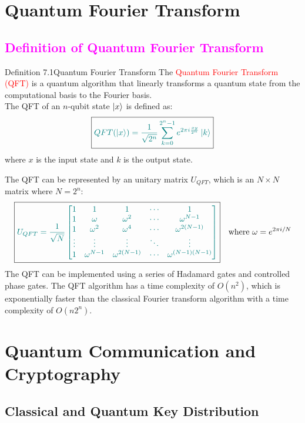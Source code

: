 \documentclass{book}
\begin{document}
\chapter{Quantum Fourier Transform}
\textcolor{magenta}{\section{\textbf{Definition of Quantum Fourier Transform}}}
\begin{defBox}{Definition 7.1}{Quantum Fourier Transform}
    The \textcolor{red}{Quantum Fourier Transform (QFT)} is a quantum algorithm that linearly transforms a quantum state from the computational basis to the Fourier basis.\\
    The QFT of an $n$-qubit state $\ket{x}$ is defined as:
    \[
        \boxed{\textcolor{teal}{QFT(\ket{x}) = \frac{1}{\sqrt{2^n}} \sum_{k=0}^{2^n - 1} e^{2\pi i \frac{xy}{2^n}} \ket{k}}}
    \]
    where $x$ is the input state and $k$ is the output state.
\end{defBox}
The QFT can be represented by an unitary matrix $U_{QFT}$, which is an $N \times N$ matrix where $N = 2^n$:
\[
    \boxed{\textcolor{teal}{U_{QFT} = \frac{1}{\sqrt{N}} \begin{bmatrix} 
        1 & 1 & 1 & \cdots & 1 \\
        1 & \omega & \omega^2 & \cdots & \omega^{N-1} \\
        1 & \omega^2 & \omega^4 & \cdots & \omega^{2(N-1)} \\
        \vdots & \vdots & \vdots & \ddots & \vdots \\
        1 & \omega^{N-1} & \omega^{2(N-1)} & \cdots & \omega^{(N-1)(N-1)}
    \end{bmatrix}}} \quad \text{where } \omega = e^{2\pi i / N}
\]
The QFT can be implemented using a series of Hadamard gates and controlled phase gates. The QFT algorithm has a time complexity of $O(n^2)$, which is exponentially faster than the classical Fourier transform algorithm with a time complexity of $O(n2^n)$.









\chapter{Quantum Communication and Cryptography}

\section{Classical and Quantum Key Distribution}
\end{document}
